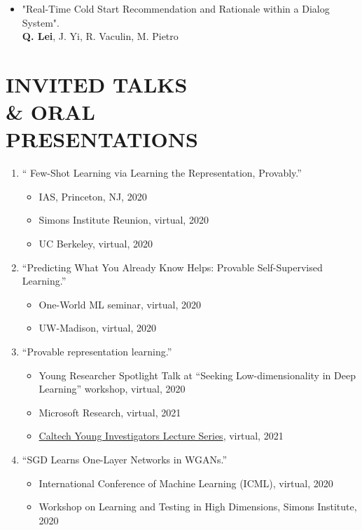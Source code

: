 \documentclass[margin, 10pt]{res} %
\begin{document}
\begin{resume}
\begin{itemize}
 \item{"Real-Time Cold Start Recommendation and Rationale within a Dialog System".\\
   \textbf{Q. Lei}, J. Yi, R. Vaculin, M. Pietro}
 \end{itemize}

 \section{INVITED TALKS\\ \& ORAL\\PRESENTATIONS}
 \begin{enumerate}
	\item{`` Few-Shot Learning via Learning the Representation, Provably.''
		\begin{itemize}[noitemsep,topsep=0pt,parsep=0pt,partopsep=0pt]
			\item 		IAS, Princeton, NJ, 2020 
			\item  Simons Institute Reunion, virtual, 2020 
			\item UC Berkeley, virtual, 2020	
		\end{itemize}
}
	 \item{``Predicting What You Already Know Helps: Provable Self-Supervised Learning.''
	 	\begin{itemize}[noitemsep,topsep=0pt,parsep=0pt,partopsep=0pt]
	 		\item One-World ML seminar, virtual, 2020
	 		\item UW-Madison, virtual, 2020	 
	 	\end{itemize}
}
	\item{``Provable representation learning.''
\begin{itemize}[noitemsep,topsep=0pt,parsep=0pt,partopsep=0pt]
	\item 		Young Researcher Spotlight Talk at ``Seeking Low-dimensionality in Deep Learning'' workshop, virtual, 2020 
	\item  Microsoft Research, virtual, 2021  
	\item \href{https://cms.caltech.edu/events/90169}{Caltech Young Investigators Lecture Series}, virtual, 2021
\end{itemize}
	 }
  \item{``SGD Learns One-Layer Networks in WGANs.''
  	\begin{itemize}[noitemsep,topsep=0pt,parsep=0pt,partopsep=0pt]
  		\item International Conference of Machine Learning (ICML), virtual, 2020
  		\item Workshop on Learning and Testing in High Dimensions, Simons Institute, 2020
  	\end{itemize} 
  }
  

\end{enumerate}
\end{resume}
\end{document}
